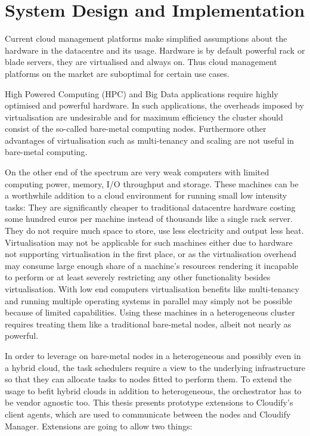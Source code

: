 \section{System Design and Implementation}

Current cloud management platforms make simplified assumptions about the hardware in the datacentre and its usage. Hardware is by default powerful rack or blade servers, they are virtualised and always on. Thus cloud management platforms on the market are suboptimal for certain use cases.

High Powered Computing (HPC) and Big Data applications require highly optimised and powerful hardware. In such applications, the overheads imposed by virtualisation are undesirable and for maximum efficiency the cluster should consist of the so-called bare-metal computing nodes. Furthermore other advantages of virtualisation such as multi-tenancy and scaling are not useful in bare-metal computing.

On the other end of the spectrum are very weak computers with limited computing power, memory, I/O throughput and storage. These machines can be a worthwhile addition to a cloud environment for running small low intensity tasks: They are significantly cheaper to traditional datacentre hardware costing some hundred euros per machine instead of thousands like a single rack server. They do not require much space to store, use less electricity and output less heat. Virtualisation may not be applicable for such machines either due to hardware not supporting virtualisation in the first place, or as the virtualisation overhead may consume large enough share of a machine's resources rendering it incapable to perform or at least severely restricting any other functionality besides virtualisation. With low end computers virtualisation benefits like multi-tenancy and running multiple operating systems in parallel may simply not be possible because of limited capabilities. Using these machines in a heterogeneous cluster requires treating them like a traditional bare-metal nodes, albeit not nearly as powerful.

In order to leverage on bare-metal nodes in a heterogeneous and possibly even in a hybrid cloud, the task schedulers require a view to the underlying infrastructure so that they can allocate tasks to nodes fitted to perform them. To extend the usage to befit hybrid clouds in addition to heterogeneous, the orchestrator has to be vendor agnostic too. This thesis presents prototype extensions to Cloudify's \cite{cloudify} client agents, which are used to communicate between the nodes and Cloudify Manager. Extensions are going to allow two things:

